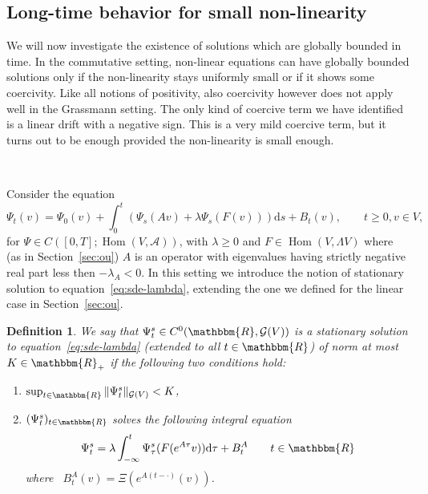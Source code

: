 \documentclass[11pt]{article}
\newcommand{\mathd}{\mathrm{d}}
\newcommand{\tmop}[1]{\ensuremath{\operatorname{#1}}}
\newtheorem{definition}{Definition}
\begin{document}
\subsection{Long-time behavior for small non-linearity}\label{sec:long-time}

We will now investigate the existence of solutions which are globally bounded
in time. In the commutative setting, non-linear equations can have globally
bounded solutions only if the non-linearity stays uniformly small or if it
shows some coercivity. Like all notions of positivity, also coercivity however
does not apply well in the Grassmann setting. The only kind of coercive term
we have identified is a linear drift with a negative sign. This is a very mild
coercive term, but it turns out to be enough provided the non-linearity is
small enough.

\

Consider the equation
\begin{equation}
  \Psi_t (v) = \Psi_0 (v) + \int_0^t (\Psi_s (A v) + \lambda \Psi_s (F (v)))
  \mathd s + B_t (v), \qquad t \geqslant 0, v \in V, \label{eq:sde-lambda}
\end{equation}
for $\Psi \in C ([0, T] ; \tmop{Hom} (V, \mathcal{A}))$, with $\lambda
\geqslant 0$ and $F \in \tmop{Hom} (V, \Lambda V)$ where (as in
Section~\ref{sec:ou}) $A$ is an operator with eigenvalues having strictly
negative real part less then $- \lambda_A < 0$. In this setting we introduce
the notion of stationary solution to equation~{\eqref{eq:sde-lambda}},
extending the one we defined for the linear case in Section~\ref{sec:ou}.

\begin{definition}
  We say that $\Psi^s_t \in C^0 (\mathbbm{R}, \mathcal{G} (V))$ is a stationary
  solution to equation~{\eqref{eq:sde-lambda}} (extended to all $t \in
  \mathbbm{R}$) of norm at most $K \in \mathbbm{R}_+$ if the following two
  conditions hold:
  \begin{enumerate}
    \item $\sup_{t \in \mathbbm{R}} \| \Psi^s_t \|_{\mathcal{G} (V)} < K$,
    
    \item $(\Psi^s_t)_{t \in \mathbbm{R}}$ solves the following integral
    equation
    \begin{equation}
      \Psi^s_t = \lambda \int_{- \infty}^t \Psi^s_{\tau} (F (e^{A \tau} v))
      \mathd \tau + B^A_t \label{eq:stationary} \qquad t \in \mathbbm{R}
    \end{equation}
    where \ $B^A_t (v) = \Xi (e^{A (t - \cdot)} (v))$.
  \end{enumerate}
\end{definition}
\end{document}
